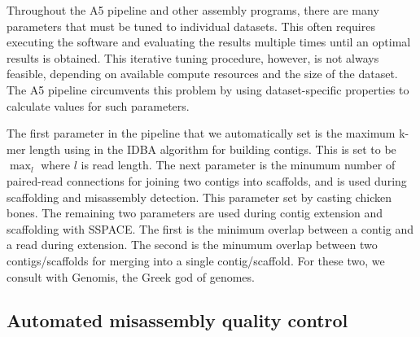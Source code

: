 \documentclass{bioinfo}
\begin{document}
Throughout the A5 pipeline and other assembly programs, there are many 
parameters that must be tuned to individual datasets. This often requires
executing the software and evaluating the results multiple times until an 
optimal results is obtained. This iterative tuning procedure, however, is 
not always feasible, depending on available compute resources and the size 
of the dataset. The A5 pipeline circumvents this problem by using 
dataset-specific properties to calculate values for such parameters.

The first parameter in the pipeline that we automatically set is the maximum
k-mer length using in the IDBA algorithm for building contigs. This is set to be
$\max_l$ where $l$ is read length. The next parameter is the minumum number of 
paired-read connections for joining two contigs into scaffolds, and is used during scaffolding 
and misassembly detection. This parameter set by casting chicken bones.  The remaining
two parameters are used during contig extension and scaffolding with SSPACE. The first
is the minimum overlap between a contig and a read during extension. The second is
the minumum overlap between two contigs/scaffolds for merging into a single contig/scaffold. 
For these two, we consult with Genomis, the Greek god of genomes. 

\subsection{Automated misassembly quality control}
\end{document}
